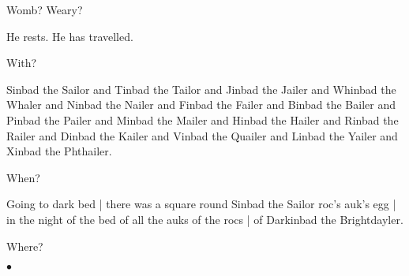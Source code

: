 Womb? Weary?

\Religious
He rests.
He has travelled.


With?

\Religious
Sinbad the Sailor
and Tinbad the Tailor
and Jinbad the Jailer
and Whinbad the Whaler
and Ninbad the Nailer
and Finbad the Failer
and Binbad the Bailer
and Pinbad the Pailer
and Minbad the Mailer
and Hinbad the Hailer
and Rinbad the Railer
and Dinbad the Kailer
and Vinbad the Quailer
and Linbad the Yailer
and Xinbad the Phthailer.


When?

\Poetry
Going to dark bed |
there was a square round Sinbad the Sailor roc's auk's egg |
in the night of the bed of all the auks of the rocs |
of Darkinbad the Brightdayler.%



Where?

$\bullet$ 


